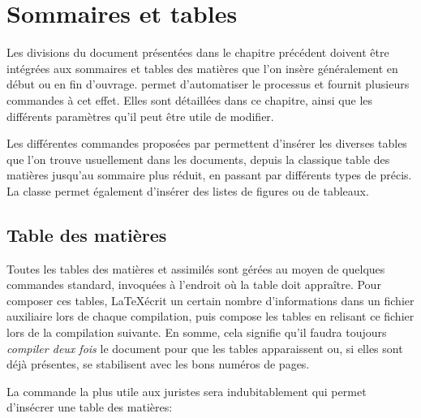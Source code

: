 



\chapter{Sommaires et tables}\label{tables-of-contents}




Les divisions du document présentées dans le chapitre précédent doivent être intégrées aux sommaires et tables des matières que l'on insère généralement en début ou en fin d'ouvrage. \frenchlaw permet d'automatiser le processus et fournit plusieurs commandes à cet effet. Elles sont détaillées dans ce chapitre, ainsi que les différents paramètres qu'il peut être utile de modifier.

Les différentes commandes proposées par \frenchlaw permettent d'insérer les diverses tables que l'on trouve usuellement dans les documents, depuis la classique table des matières jusqu'au sommaire plus réduit, en passant par différents types de précis. La classe permet également d'insérer des listes de figures ou de tableaux.

\section{Table des matières}

Toutes les tables des matières et assimilés sont gérées au moyen de quelques commandes standard, invoquées à l'endroit où la table doit appraître. Pour composer ces tables, \LaTeX écrit un certain nombre d'informations dans un fichier auxiliaire lors de chaque compilation, puis compose les tables en relisant ce fichier lors de la compilation suivante. En somme, cela signifie qu'il faudra toujours \emph{compiler deux fois} le document pour que les tables apparaissent ou, si elles sont déjà présentes, se stabilisent avec les bons numéros de pages.

La commande la plus utile aux juristes sera indubitablement  qui permet d'insécrer une table des matières:

